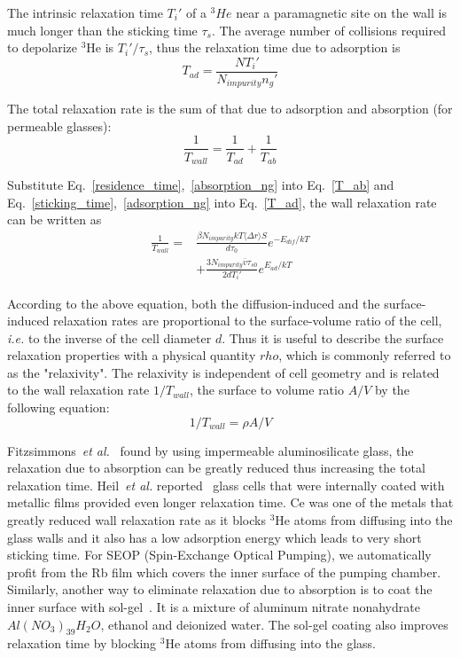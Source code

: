 The intrinsic relaxation time $T_i'$ of a $^{3}He$ near a paramagnetic site on the wall is much longer than the sticking time $\tau_s$. The average number of collisions required to depolarize $^{3}$He is $T_i'/\tau_s$, thus the relaxation time due to adsorption is
\begin{equation}\label{T_ad}
T_{ad}=\frac{NT_i'}{N_{impurity}n_g'}
\end{equation}

The total relaxation rate is the sum of that due to adsorption and absorption (for permeable glasses):
\begin{equation}
\frac{1}{T_{wall}}=\frac{1}{T_{ad}}+\frac{1}{T_{ab}}
\end{equation}

Substitute Eq.~\ref{residence_time},~\ref{absorption_ng} into Eq.~\ref{T_ab} and Eq.~\ref{sticking_time},~\ref{adsorption_ng} into Eq.~\ref{T_ad}, the wall relaxation rate can be written as
\begin{equation}
\begin{split}
\frac{1}{T_{wall}}=&\frac{\beta N_{impurity}kT\langle\Delta r\rangle S}{d\tau_0}e^{-E_{dif}/kT}\\
&+\frac{3N_{impurity}\bar{v}\tau_{s0}}{2dT_i'}e^{E_{ad}/kT}
\end{split}
\end{equation}

According to the above equation, both the diffusion-induced and the surface-induced relaxation rates are proportional to the surface-volume ratio of the cell, \emph{i.e.} to the inverse of the cell diameter $d$. Thus it is useful to describe the surface relaxation properties with a physical quantity $rho$, which is commonly referred to as the "relaxivity". The relaxivity is independent of cell geometry and is related to the wall relaxation rate $1/T_{wall}$, the surface to volume ratio $A/V$ by the following equation:
\begin{equation}
1/T_{wall}=\rho A/V
\end{equation}

Fitzsimmons~\emph{et al.}~\cite{PhysRev.179.156} found by using impermeable aluminosilicate glass, the relaxation due to absorption can be greatly reduced thus increasing the total relaxation time. Heil~\emph{et al.} reported~\cite{PhysRevA.201.337} glass cells that were internally coated with metallic films provided even longer relaxation time. Ce was one of the metals that greatly reduced wall relaxation rate as it blocks $^{3}$He atoms from diffusing into the glass walls and it also has a low adsorption energy which leads to very short sticking time. For SEOP (Spin-Exchange Optical Pumping), we automatically profit from the Rb film which covers the inner surface of the pumping chamber. Similarly, another way to eliminate relaxation due to absorption is to coat the inner surface with sol-gel~\cite{solgel}. It is a mixture of aluminum nitrate nonahydrate $Al(NO_3)_39H_2O$, ethanol and deionized water. The sol-gel coating also improves relaxation time by blocking $^{3}$He atoms from diffusing into the glass.

